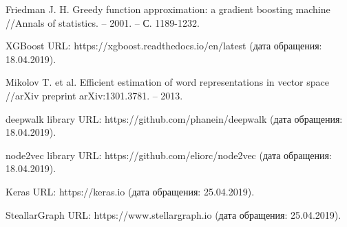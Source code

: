 \begin{thebibliography}{9}
Friedman J. H. Greedy function approximation: a gradient boosting machine //Annals of statistics. – 2001. – С. 1189-1232.

XGBoost URL: https://xgboost.readthedocs.io/en/latest (дата обращения: 18.04.2019).

Mikolov T. et al. Efficient estimation of word representations in vector space //arXiv preprint arXiv:1301.3781. – 2013.

deepwalk library URL: https://github.com/phanein/deepwalk (дата обращения: 18.04.2019).

node2vec library URL: https://github.com/eliorc/node2vec (дата обращения: 18.04.2019).

Keras URL: https://keras.io (дата обращения: 25.04.2019).

SteallarGraph URL: https://www.stellargraph.io (дата обращения: 25.04.2019).

\end{thebibliography}
\endgroup

\clearpage